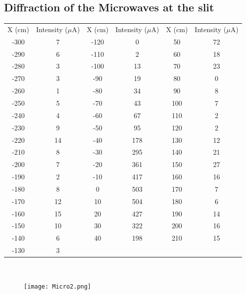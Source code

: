 \documentclass[12pt]{report}
\begin{document}
\subsection{Diffraction of the Microwaves at the slit}
\begin{center}
	\begin{tabular}{ |c|c|c|c|c|c| } 
		\hline
		X (cm) & Intensity ($\mu$A) & X (cm) & Intensity ($\mu$A) & X (cm) & Intensity ($\mu$A)\\ 
		-300 & 7  & -120 & 0   & 50  & 72 \\
		-290 & 6  & -110 & 2   & 60  & 18 \\
		-280 & 3  & -100 & 13  & 70  & 23 \\
		-270 & 3  & -90  & 19  & 80  & 0  \\
		-260 & 1  & -80  & 34  & 90  & 8  \\
		-250 & 5  & -70  & 43  & 100 & 7  \\
		-240 & 4  & -60  & 67  & 110 & 2  \\
		-230 & 9  & -50  & 95  & 120 & 2  \\
		-220 & 14 & -40  & 178 & 130 & 12 \\
		-210 & 8  & -30  & 295 & 140 & 21 \\
		-200 & 7  & -20  & 361 & 150 & 27 \\
		-190 & 2  & -10  & 417 & 160 & 16 \\
		-180 & 8  & 0    & 503 & 170 & 7  \\
		-170 & 12 & 10   & 504 & 180 & 6  \\
		-160 & 15 & 20   & 427 & 190 & 14 \\
		-150 & 10 & 30   & 322 & 200 & 16 \\
		-140 & 6  & 40   & 198 & 210 & 15 \\
		-130 & 3  &      &     &     &    \\
		\hline
	\end{tabular}
	\\
\end{center}

\begin{figure}[h!]
	\centering
	\texttt{[image: Micro2.png]}
\end{figure}

\newpage
\end{document}
